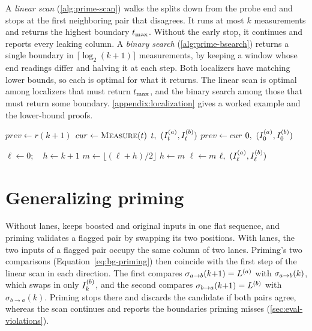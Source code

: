 A \emph{linear scan} (\autoref{alg:prime-scan}) walks the splits down from the probe end and stops
at the first neighboring pair that disagrees. It runs at most $k$ measurements and returns the
highest boundary $\tmax$. Without the early stop, it continues and reports every leaking column. A
\emph{binary search} (\autoref{alg:prime-bsearch}) returns a single boundary in
$\lceil\log_2(k+1)\rceil$ measurements, by keeping a window whose end readings differ and halving it
at each step. Both localizers have matching lower bounds, so each is optimal for what it returns.
The linear scan is optimal among localizers that must return $\tmax$, and the binary search among
those that must return some boundary. \autoref{appendix:localization} gives a worked example and the
lower-bound proofs.

\begin{algorithm}[t]
\caption{Linear scan ($a\!\to\!b$), returns $\tmax$}
\label{alg:prime-scan}
\begin{algorithmic}[1]
\STATE $\mathit{prev} \gets r(k{+}1)$ 
  \STATE $\mathit{cur} \gets \textsc{Measure}(t)$
     \RETURN $t,\ (I_{t}^{(a)}, I_{t}^{(b)})$ 
  \ENDIF
  \STATE $\mathit{prev} \gets \mathit{cur}$
\ENDFOR
\RETURN $0,\ (I_{0}^{(a)}, I_{0}^{(b)})$
\end{algorithmic}
\end{algorithm}

\begin{algorithm}[t]
\caption{Binary search ($a\!\to\!b$)}
\label{alg:prime-bsearch}
\begin{algorithmic}[1]
\STATE $\ell \gets 0;\quad h \gets k{+}1$ 
  \STATE $m \gets \lfloor (\ell+h)/2 \rfloor$
     \STATE $h \gets m$ 
  \ELSE
     \STATE $\ell \gets m$ 
  \ENDIF
\ENDWHILE
\RETURN $\ell,\ (I_{\ell}^{(a)}, I_{\ell}^{(b)})$
\end{algorithmic}
\end{algorithm}

\section{Generalizing priming}
\label{sec:priming-generalize}

Without lanes, \revizor{} keeps boosted and original inputs in one flat sequence, and priming
validates a flagged pair by swapping its two positions. With lanes, the two inputs of a flagged pair
occupy the same column of two lanes. Priming's two comparisons (Equation~\eqref{eq:bg-priming}) then
coincide with the first step of the linear scan in each direction. The first compares
$\sigma_{a\to b}(k{+}1)=L^{(a)}$ with $\sigma_{a\to b}(k)$, which swaps in only $I_{k}^{(b)}$, and the second compares
$\sigma_{b\to a}(k{+}1)=L^{(b)}$ with $\sigma_{b\to a}(k)$. Priming stops there and discards the
candidate if both pairs agree, whereas the scan continues and reports the boundaries priming misses
(\autoref{sec:eval-violations}).

